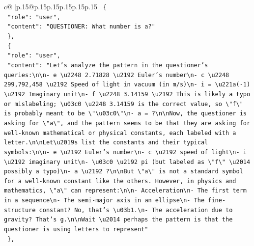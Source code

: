\documentclass{article}
\begin{document}
{\begin{supertabular}{c@{$\;$}|p{.15\linewidth}@{}p{.15\linewidth}p{.15\linewidth}p{.15\linewidth}p{.15\linewidth}p{.15\linewidth}}
{{{\texttt{  \{} \\
\texttt{    "role": "user",} \\
\texttt{    "content": "QUESTIONER: What number is a?"} \\
\texttt{  \},} \\
\texttt{  \{} \\
\texttt{    "role": "user",} \\
\texttt{    "content": "Let's analyze the pattern in the questioner's queries:\textbackslash{}n\textbackslash{}n{-} e \textbackslash{}u2248 2.71828 \textbackslash{}u2192 Euler's number\textbackslash{}n{-} c \textbackslash{}u2248 299,792,458 \textbackslash{}u2192 Speed of light in vacuum (in m/s)\textbackslash{}n{-} i = \textbackslash{}u221a({-}1) \textbackslash{}u2192 Imaginary unit\textbackslash{}n{-} f \textbackslash{}u2248 3.14159 \textbackslash{}u2192 This is likely a typo or mislabeling; \textbackslash{}u03c0 \textbackslash{}u2248 3.14159 is the correct value, so \textbackslash{}"f\textbackslash{}" is probably meant to be \textbackslash{}"\textbackslash{}u03c0\textbackslash{}"\textbackslash{}n{-} a = ?\textbackslash{}n\textbackslash{}nNow, the questioner is asking for \textbackslash{}"a\textbackslash{}", and the pattern seems to be that they are asking for well{-}known mathematical or physical constants, each labeled with a letter.\textbackslash{}n\textbackslash{}nLet\textbackslash{}u2019s list the constants and their typical symbols:\textbackslash{}n\textbackslash{}n{-} e \textbackslash{}u2192 Euler's number\textbackslash{}n{-} c \textbackslash{}u2192 speed of light\textbackslash{}n{-} i \textbackslash{}u2192 imaginary unit\textbackslash{}n{-} \textbackslash{}u03c0 \textbackslash{}u2192 pi (but labeled as \textbackslash{}"f\textbackslash{}" \textbackslash{}u2014 possibly a typo)\textbackslash{}n{-} a \textbackslash{}u2192 ?\textbackslash{}n\textbackslash{}nBut \textbackslash{}"a\textbackslash{}" is not a standard symbol for a well{-}known constant like the others. However, in physics and mathematics, \textbackslash{}"a\textbackslash{}" can represent:\textbackslash{}n\textbackslash{}n{-} Acceleration\textbackslash{}n{-} The first term in a sequence\textbackslash{}n{-} The semi{-}major axis in an ellipse\textbackslash{}n{-} The fine{-}structure constant? No, that's \textbackslash{}u03b1.\textbackslash{}n{-} The acceleration due to gravity? That's g.\textbackslash{}n\textbackslash{}nWait \textbackslash{}u2014 perhaps the pattern is that the questioner is using letters to represent"} \\
\texttt{  \},} \\
}}}
\end{supertabular}}
\end{document}
